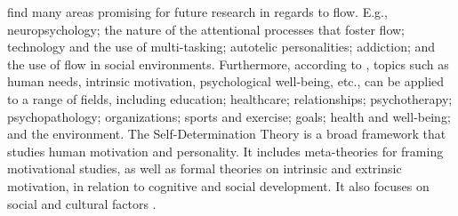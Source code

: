 \cite{flowTwo} find many areas promising for future research in regards to flow. E.g., neuropsychology; the nature of the attentional processes that foster flow; technology and the use of multi-tasking; autotelic personalities; addiction; and the use of flow in social environments. Furthermore, according to \cite{sdt_website}, topics such as human needs, intrinsic motivation, psychological well-being, etc., can be applied to a range of fields, including education; healthcare; relationships; psychotherapy; psychopathology; organizations; sports and exercise; goals; health and well-being; and the environment. The Self-Determination Theory is a broad framework that studies human motivation and personality. It includes meta-theories for framing motivational studies, as well as formal theories on intrinsic and extrinsic motivation, in relation to cognitive and social development. It also focuses on social and cultural factors \citep{sdt_website}.